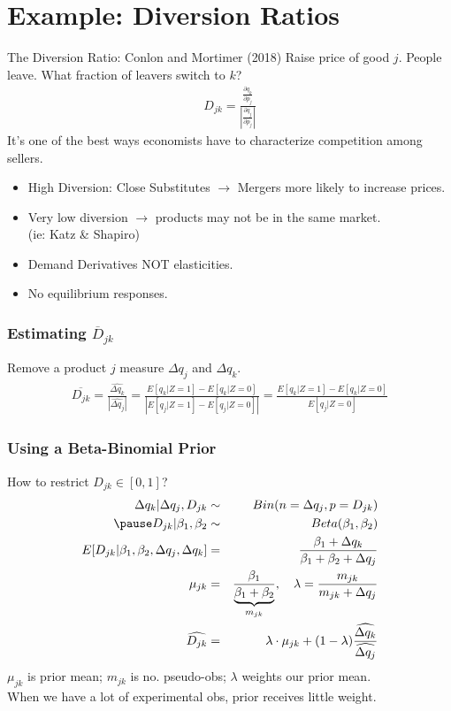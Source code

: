 \documentclass[aspectratio=169]{beamer}
\begin{document}
\section{Example: Diversion Ratios}
\begin{frame}{The Diversion Ratio: Conlon and Mortimer (2018)}
 Raise price of good $j$. People leave. What fraction of leavers switch to $k$?
\begin{eqnarray*}
D_{jk} = \frac{\frac{\partial q_k}{\partial p_j}}{\left|\frac{\partial q_j}{\partial p_j} \right|}
\end{eqnarray*}
It's one of the best ways economists have to characterize competition among sellers.
\begin{itemize}
\item High Diversion: Close Substitutes $\rightarrow$ Mergers more likely to increase prices.
\item Very low diversion $\rightarrow$ products may not be in the same market.\\ (ie: Katz \& Shapiro)
\item Demand Derivatives NOT elasticities.
\item No equilibrium responses.
\end{itemize}
\end{frame}

\begin{frame}
\frametitle{Estimating $\overline{D}_{jk}$}
Remove a product $j$ measure $\Delta q_j$ and $\Delta q_k$.
 \begin{eqnarray*}
 \overline{D_{jk}} =  \frac{\widehat{\Delta q_k}}{|\widehat{\Delta q_j}|} = \frac{ E[q_k | Z=1] - E[q_k | Z=0]}{ \left| E[q_j | Z=1] - E[q_j | Z=0] \right|}  
 =\frac{ E[q_k | Z=1] - E[q_k | Z=0]}{ E[q_j | Z=0] }
 \end{eqnarray*}
\end{frame}

\begin{frame}
\frametitle{Using a Beta-Binomial Prior}
How to restrict $D_{jk} \in [0,1]$?
\begin{eqnarray*}
\Delta q_k | \Delta q_j,D_{jk} &\sim& Bin(n=\Delta q_j, p=D_{jk})\\ \pause
 D_{jk} | \beta_1, \beta_2 &\sim& Beta(\beta_1,\beta_2)\\
E[D_{jk} | \beta_1, \beta_2, \Delta q_j, \Delta q_k] &=& \frac{\beta_1 + \Delta q_k}{\beta_1 + \beta_2 + \Delta q_j}\\ \mu_{jk} &=& \frac{\beta_1}{\underbrace{\beta_1+\beta_2}_{m_{jk}}},  \quad \lambda = \frac{m_{jk}}{m_{jk} + \Delta q_j} \\
\widehat{D_{jk}} &=& \lambda \cdot \mu_{jk} + (1-\lambda) \frac{\widehat{\Delta q_k}}{\widehat{\Delta q_j}}
\end{eqnarray*}
$\mu_{jk}$ is prior mean; $m_{jk}$ is no. pseudo-obs; $\lambda$ weights our prior mean. \\%
When we have a lot of experimental obs, prior receives little weight.
\end{frame}
\end{document}
